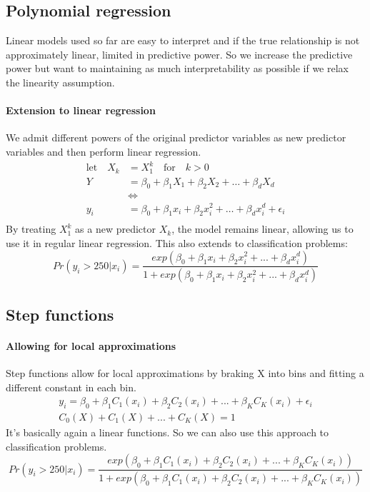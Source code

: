 \documentclass[../document.tex]{subfiles}
\begin{document}
	\subsection{Polynomial regression}
	Linear models used so far are easy to interpret and if the true relationship is not approximately linear, limited in predictive power. So we increase the predictive power but want to maintaining as much interpretability as possible if we relax the linearity assumption.

	\paragraph{Extension to linear regression}
	We admit different powers of the original predictor variables as new predictor variables and then perform linear regression.
	\begin{equation}
	\begin{split}
		\text{let} \quad X_{k} &= X^{k}_1 \quad \text{for} \quad k>0\\
		Y &= \beta_{0} + \beta_{1}X_{1} + \beta_{2}X_{2} + \dots + \beta_{d}X_{d}\\
		&\Leftrightarrow  \\
		y_{i} &= \beta_{0}+\beta_{1}x_{i}+\beta_{2}x_{i}^2 + \dots + \beta_{d}x_{i}^d+\epsilon_{i} \\
	\end{split}
	\end{equation}
	By treating $X_1^k$ as a new predictor $X_k$, the model remains linear, allowing us to use it in regular linear regression.
	This also extends to classification problems:
	\begin{equation}
		Pr(y_{i}>250|x_{i})=\frac{exp(\beta_{0}+\beta_{1}x_{i}+\beta_{2}x_{i}^2+...+\beta_{d}x_{i}^d)}{1+exp(\beta_{0}+\beta_{1}x_{i}+\beta_{2}x_{i}^2+...+\beta_{d}x_{i}^d)}
	\end{equation}

	\subsection{Step functions}

	\paragraph{Allowing for local approximations}
	Step functions allow for local approximations by braking X into bins and fitting a different constant in each bin.
	\begin{equation}
	\begin{split}
		y_{i}=\beta_{0}+\beta_{1}C_{1}(x_{i})+\beta_{2}C_{2}(x_{i})+...+\beta_{K}C_{K}(x_{i})+\epsilon_{i}\\
		C_{0}(X)+C_{1}(X)+...+C_{K}(X)=1
	\end{split}
	\end{equation}
	It's basically again a linear functions. So we can also use this approach to classification problems.
	\begin{equation}
		Pr(y_{i}>250|x_{i})=\frac{exp(\beta_{0}+\beta_{1}C_{1}(x_{i})+\beta_{2}C_{2}(x_{i})+...+\beta_{K}C_{K}(x_{i}))}{1+exp(\beta_{0}+\beta_{1}C_{1}(x_{i})+\beta_{2}C_{2}(x_{i})+...+\beta_{K}C_{K}(x_{i}))}
	\end{equation}
\end{document}

